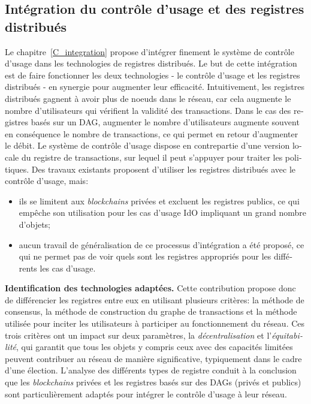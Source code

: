 \begin{otherlanguage}{french}
\section*{Intégration du contrôle d'usage et des registres distribués}

Le chapitre~\ref{C_integration} propose d'intégrer finement le système de contrôle d'usage dans les technologies de registres distribués. Le but de cette intégration est de faire fonctionner les deux technologies - le contrôle d'usage et les registres distribués - en synergie pour augmenter leur efficacité. Intuitivement, les registres distribués gagnent à avoir plus de noeuds dans le réseau, car cela augmente le nombre d'utilisateurs qui vérifient la validité des transactions. Dans le cas des registres basés sur un DAG, augmenter le nombre d'utilisateurs augmente souvent en conséquence le nombre de transactions, ce qui permet en retour d'augmenter le débit.
Le système de contrôle d'usage dispose en contrepartie d'une version locale du registre de transactions, sur lequel il peut s'appuyer pour traiter les politiques.
Des travaux existants \cite{Khan2020, Shi2021, Zhaofeng2021} proposent d'utiliser les registres distribués avec le contrôle d'usage, mais: 
\begin{itemize}
    \item ils se limitent aux \emph{blockchains} privées et excluent les registres publics, ce qui empêche son utilisation pour les cas d'usage IdO impliquant un grand nombre d'objets;
    \item aucun travail de généralisation de ce processus d'intégration a été proposé, ce qui ne permet pas de voir quels sont les registres appropriés pour les différents les cas d'usage.
\end{itemize}

\textbf{Identification des technologies adaptées.} Cette contribution propose donc de différencier les registres entre eux en utilisant plusieurs critères: la méthode de consensus, la méthode de construction du graphe de transactions et la méthode utilisée pour inciter les utilisateurs à participer au fonctionnement du réseau. Ces trois critères ont un impact sur deux paramètres, la \emph{décentralisation} et l'\emph{équitabilité}, qui garantit que tous les objets y compris ceux avec des capacités limitées peuvent contribuer au réseau de manière significative, typiquement dans le cadre d'une élection. L'analyse des différents types de registre conduit à la conclusion que les \emph{blockchains} privées et les registres basés sur des DAGs (privés et publics) sont particulièrement adaptés pour intégrer le contrôle d'usage à leur réseau.


\end{otherlanguage}
